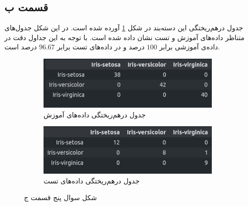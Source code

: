 \documentclass{article}
\begin{document}
\subsection*{قسمت ب}

جدول درهم‌ریختگی این دسته‌بند در شکل \ref{implementation-question1-partb} آورده شده است. در این شکل جدول‌های متناظر
داده‌های آموزش و تست نشان داده شده است. با توجه به این جداول دقت در داده‌ی آموزشی
برابر $100$ درصد و در داده‌های تست برابر $96.67$ درصد است.

\begin{figure}[h]
    \begin{subfigure}{0.48\linewidth}
        \includegraphics[width=\linewidth]{images/implementation/q1/train_confusion_matrix.png}
        \caption{جدول درهم‌ریختگی داده‌های آموزش}
    \end{subfigure}
    \hfill
    \begin{subfigure}{0.48\linewidth}
        \includegraphics[width=\linewidth]{images/implementation/q1/test_confusion_matrix.png}
        \caption{جدول درهم‌ریختگی داده‌های تست}
    \end{subfigure}
    \caption{شکل سوال پنج قسمت ج}
    \label{implementation-question1-partb}
\end{figure}
\end{document}
